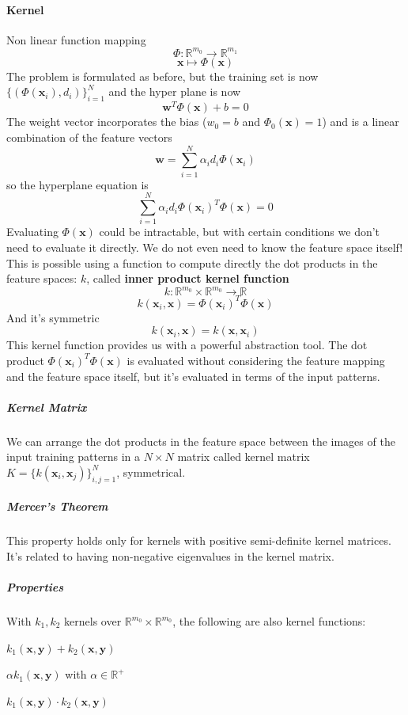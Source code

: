 \documentclass[10pt]{report}
\begin{document}
\paragraph{Kernel} Non linear function mapping $$\Phi:\mathbb{R}^{m_0}\rightarrow \mathbb{R}^{m_1}$$ $$\mathbf{x}\mapsto \Phi(\mathbf{x})$$
The problem is formulated as before, but the training set is now $\{(\Phi(\mathbf{x}_i), d_i)\}_{i=1}^N$ and the hyper plane is now $$\mathbf{w}^T\Phi(\mathbf{x}) + b = 0$$
The weight vector incorporates the bias ($w_0=b$ and $\Phi_0(\mathbf{x})=1$) and is a linear combination of the feature vectors
$$\mathbf{w}=\sum_{i=1}^N\alpha_id_i\Phi(\mathbf{x}_i)$$ so the hyperplane equation is $$\sum_{i=1}^N\alpha_id_i\Phi(\mathbf{x}_i)^T\Phi(\mathbf{x}) = 0$$
Evaluating $\Phi(\mathbf{x})$ could be intractable, but with certain conditions we don't need to evaluate it directly. We do not even need to know the feature space itself! This is possible using a function to compute directly the dot products in the feature spaces: $k$, called \textbf{inner product kernel function} $$k:\mathbb{R}^{m_0}\times \mathbb{R}^{m_0}\rightarrow \mathbb{R}$$ $$k(\mathbf{x}_i, \mathbf{x}) = \Phi(\mathbf{x}_i)^T\Phi(\mathbf{x})$$ And it's symmetric $$k(\mathbf{x}_i, \mathbf{x}) = k(\mathbf{x}, \mathbf{x}_i)$$
This kernel function provides us with a powerful abstraction tool. The dot product $\Phi(\mathbf{x}_i)^T\Phi(\mathbf{x})$ is evaluated without considering the feature mapping and the feature space itself, but it's evaluated in terms of the input patterns.
\subparagraph{Kernel Matrix} We can arrange the dot products in the feature space between the images of the input training patterns in a $N\times N$ matrix called kernel matrix $K = \{k(\mathbf{x}_i, \mathbf{x}_j)\}_{i,j=1}^N$, symmetrical.
\subparagraph{Mercer's Theorem} This property holds only for kernels with positive semi-definite kernel matrices. It's related to having non-negative eigenvalues in the kernel matrix.
\subparagraph{Properties} With $k_1,k_2$ kernels over $\mathbb{R}^{m_0}\times \mathbb{R}^{m_0}$, the following are also kernel functions:
\begin{list}{}{}
	\item $k_1(\mathbf{x},\mathbf{y})+k_2(\mathbf{x},\mathbf{y})$
	\item $\alpha k_1(\mathbf{x},\mathbf{y})$ with $\alpha\in \mathbb{R}^+$
	\item $k_1(\mathbf{x},\mathbf{y})\cdot k_2(\mathbf{x},\mathbf{y})$
\end{list}
\end{document}
